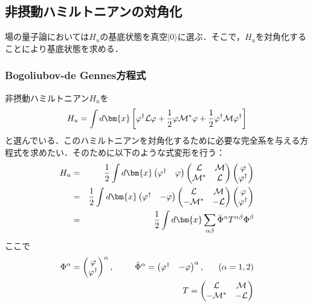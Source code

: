 \documentclass[10.5pt,a4paper]{jreport}
\begin{document}
\subsection{非摂動ハミルトニアンの対角化}
場の量子論においては$H_u$の基底状態を真空$|0\rangle$に選ぶ．そこで，$H_u$を対角化することにより基底状態を求める．
\subsubsection{Bogoliubov-de Gennes方程式}
非摂動ハミルトニアン$H_u$を
\begin{eqnarray}
  H_{u} = \int d\bm{x}\left[\varphi^\dagger{\cal L}\varphi + \frac{1}{2}\varphi{\cal M^*}\varphi+\frac{1}{2}\varphi^\dagger{\cal M}\varphi^\dagger\right]
\end{eqnarray}
と選んでいる．このハミルトニアンを対角化するために必要な完全系を与える方程式を求めたい．そのために以下のような式変形を行う：
\begin{eqnarray}
  H_{u} &=& \frac{1}{2} \int d\bm{x}
  \begin{pmatrix}
    \varphi^\dagger & \varphi \\
  \end{pmatrix}
  \begin{pmatrix}
    {\cal L} & {\cal M}  \\
    {\cal M^*} & {\cal L} 
  \end{pmatrix}
  \begin{pmatrix}
    \varphi \\
    \varphi^\dagger
  \end{pmatrix}\\
  &=& \frac{1}{2} \int d\bm{x}
  \begin{pmatrix}
    \varphi^\dagger & -\varphi \\
  \end{pmatrix}
  \begin{pmatrix}
    {\cal L} & {\cal M}  \\
    {-\cal M^*} & {-\cal L} 
  \end{pmatrix}
  \begin{pmatrix}
    \varphi \\
    \varphi^\dagger
  \end{pmatrix}
  \\
  &=&\frac{1}{2}\int d\bm{x}\sum_{\alpha \beta}\bar{\Phi}^\alpha T^{\alpha \beta}\Phi^\beta
\end{eqnarray}
ここで
\begin{eqnarray}
  \Phi^\alpha = 
  \begin{pmatrix}
    \varphi \\
    \varphi^\dagger
  \end{pmatrix}^\alpha,&&\ \ \ \ \ 
  \bar\Phi^\alpha=
  \begin{pmatrix}
    \varphi^\dagger & -\varphi \\
  \end{pmatrix}^\alpha,\ \ \ \ \ 
  (\alpha = 1,2)\label{Phi_difinition}\\
  &&T=
  \begin{pmatrix}
    {\cal L} & {\cal M}  \\
    {-\cal M^*} & {-\cal L} 
  \end{pmatrix}
\end{eqnarray}
\end{document}
